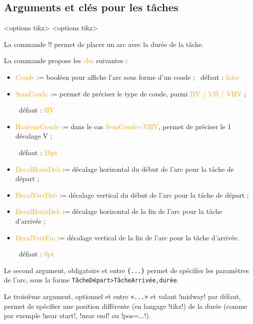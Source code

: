 \documentclass[french,a4paper,11pt]{article}
\newcommand\Cle[1]{{\small\sffamily\textlangle \textcolor{orange}{#1}\textrangle}}
\begin{document}
{{\pagebreak

\subsection{Arguments et clés pour les tâches}

\begin{DemoCode}
\begin{GrapheMPM}[clés]<options tikz>
	<options tikz>
\end{GrapheMPM}
\end{DemoCode}

\begin{tipblock}
La commande \motcletex!\MPMPlaceDuree! permet de placer un arc avec la durée de la tâche.

\smallskip

La commande propose les \Cle{clés} suivantes :

\begin{itemize}
	\item \Cle{Coude} := booléen pour affiche l'arc sous forme d'un coude ; \hfill~défaut : \Cle{false}
	\item \Cle{SensCoude} := permet de préciser le type de coude, parmi \Cle{HV / VH / VHV} ;
	
	\hfill~défaut : \Cle{HV}
	\item \Cle{HauteurCoude} := dans le cas \Cle{SensCoude=VHV}, permet de préciser le 1\ier{} décalage V ;
	
	\hfill~défaut : \Cle{10pt}
	\item \Cle{DecalHorizDeb} := décalage horizontal du début de l'arc pour la tâche de départ ;
	\item \Cle{DecalVertDeb} := décalage vertical du début de l'arc pour la tâche de départ ;
	\item \Cle{DecalHorizDeb} := décalage horizontal de la fin de l'arc pour la tâche d'arrivée ;
	\item \Cle{DecalVertFin} := décalage vertical de la fin de l'arc pour la tâche d'arrivée.
	
	\hfill~défaut : \Cle{0pt}
\end{itemize}

Le second argument, obligatoire et entre \texttt{\{...\}} permet de spécifier les paramètres de l'arc, sous la forme \verb!TâcheDépart>TâcheArrivée,durée!.

\smallskip

Le troisième argument, optionnel et entre \texttt{<...>} et valant \motcletex!midway! par défaut, permet de spécifier une position différente (en langage \packagetex!tikz!) de la durée (comme par exemple \motcletex!near start!, \motcletex!near end! ou \motcletex!pos=...!).
\end{tipblock}

}}
\end{document}
